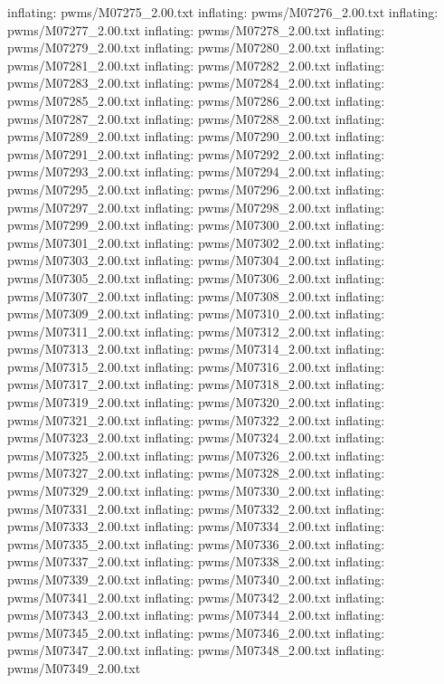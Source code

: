 \documentclass[letterpaper,10pt,english]{sphinxmanual}
\begin{document}
{\begin{sphinxVerbatim}[commandchars=\\\{\}]
  inflating: pwms/M07275\_2.00.txt
  inflating: pwms/M07276\_2.00.txt
  inflating: pwms/M07277\_2.00.txt
  inflating: pwms/M07278\_2.00.txt
  inflating: pwms/M07279\_2.00.txt
  inflating: pwms/M07280\_2.00.txt
  inflating: pwms/M07281\_2.00.txt
  inflating: pwms/M07282\_2.00.txt
  inflating: pwms/M07283\_2.00.txt
  inflating: pwms/M07284\_2.00.txt
  inflating: pwms/M07285\_2.00.txt
  inflating: pwms/M07286\_2.00.txt
  inflating: pwms/M07287\_2.00.txt
  inflating: pwms/M07288\_2.00.txt
  inflating: pwms/M07289\_2.00.txt
  inflating: pwms/M07290\_2.00.txt
  inflating: pwms/M07291\_2.00.txt
  inflating: pwms/M07292\_2.00.txt
  inflating: pwms/M07293\_2.00.txt
  inflating: pwms/M07294\_2.00.txt
  inflating: pwms/M07295\_2.00.txt
  inflating: pwms/M07296\_2.00.txt
  inflating: pwms/M07297\_2.00.txt
  inflating: pwms/M07298\_2.00.txt
  inflating: pwms/M07299\_2.00.txt
  inflating: pwms/M07300\_2.00.txt
  inflating: pwms/M07301\_2.00.txt
  inflating: pwms/M07302\_2.00.txt
  inflating: pwms/M07303\_2.00.txt
  inflating: pwms/M07304\_2.00.txt
  inflating: pwms/M07305\_2.00.txt
  inflating: pwms/M07306\_2.00.txt
  inflating: pwms/M07307\_2.00.txt
  inflating: pwms/M07308\_2.00.txt
  inflating: pwms/M07309\_2.00.txt
  inflating: pwms/M07310\_2.00.txt
  inflating: pwms/M07311\_2.00.txt
  inflating: pwms/M07312\_2.00.txt
  inflating: pwms/M07313\_2.00.txt
  inflating: pwms/M07314\_2.00.txt
  inflating: pwms/M07315\_2.00.txt
  inflating: pwms/M07316\_2.00.txt
  inflating: pwms/M07317\_2.00.txt
  inflating: pwms/M07318\_2.00.txt
  inflating: pwms/M07319\_2.00.txt
  inflating: pwms/M07320\_2.00.txt
  inflating: pwms/M07321\_2.00.txt
  inflating: pwms/M07322\_2.00.txt
  inflating: pwms/M07323\_2.00.txt
  inflating: pwms/M07324\_2.00.txt
  inflating: pwms/M07325\_2.00.txt
  inflating: pwms/M07326\_2.00.txt
  inflating: pwms/M07327\_2.00.txt
  inflating: pwms/M07328\_2.00.txt
  inflating: pwms/M07329\_2.00.txt
  inflating: pwms/M07330\_2.00.txt
  inflating: pwms/M07331\_2.00.txt
  inflating: pwms/M07332\_2.00.txt
  inflating: pwms/M07333\_2.00.txt
  inflating: pwms/M07334\_2.00.txt
  inflating: pwms/M07335\_2.00.txt
  inflating: pwms/M07336\_2.00.txt
  inflating: pwms/M07337\_2.00.txt
  inflating: pwms/M07338\_2.00.txt
  inflating: pwms/M07339\_2.00.txt
  inflating: pwms/M07340\_2.00.txt
  inflating: pwms/M07341\_2.00.txt
  inflating: pwms/M07342\_2.00.txt
  inflating: pwms/M07343\_2.00.txt
  inflating: pwms/M07344\_2.00.txt
  inflating: pwms/M07345\_2.00.txt
  inflating: pwms/M07346\_2.00.txt
  inflating: pwms/M07347\_2.00.txt
  inflating: pwms/M07348\_2.00.txt
  inflating: pwms/M07349\_2.00.txt

\end{sphinxVerbatim}}
\end{document}
